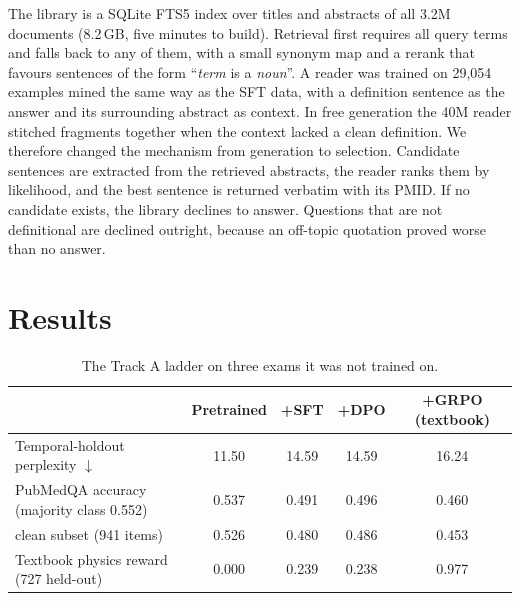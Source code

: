 \documentclass[11pt]{article}
\begin{document}
The library is a SQLite FTS5 index over titles and abstracts of all 3.2M
documents (8.2\,GB, five minutes to build). Retrieval first requires all
query terms and falls back to any of them, with a small synonym map and a
rerank that favours sentences of the form ``\emph{term} is a \emph{noun}''.
A reader was trained on 29,054 examples mined the same way as the SFT data,
with a definition sentence as the answer and its surrounding abstract as
context. In free generation the 40M reader stitched fragments together
when the context lacked a clean definition. We therefore changed the
mechanism from generation to selection. Candidate sentences are extracted
from the retrieved abstracts, the reader ranks them by likelihood, and the
best sentence is returned verbatim with its PMID. If no candidate exists,
the library declines to answer. Questions that are not definitional are
declined outright, because an off-topic quotation proved worse than no
answer.

\section{Results}
\label{sec:results}

\begin{table}[t]
\centering\small
\begin{tabular}{@{}lcccc@{}}
\toprule
& Pretrained & +SFT & +DPO & +GRPO (textbook)\\
\midrule
Temporal-holdout perplexity $\downarrow$ & 11.50 & 14.59 & 14.59 & 16.24\\
PubMedQA accuracy (majority class 0.552) & 0.537 & 0.491 & 0.496 & 0.460\\
\quad clean subset (941 items) & 0.526 & 0.480 & 0.486 & 0.453\\
Textbook physics reward (727 held-out) & 0.000 & 0.239 & 0.238 & 0.977\\
\bottomrule
\end{tabular}
\caption{The Track A ladder on three exams it was not trained on.}
\label{tab:ladder}
\end{table}
\end{document}
